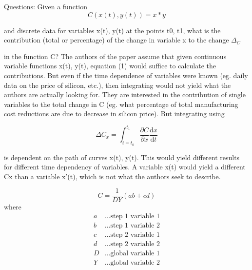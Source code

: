 \documentclass{article}
\begin{document}
Questions:
Given a function
\begin{equation}
    C(x(t), y(t)) = x * y
\end{equation}

and discrete data for variables x(t), y(t) at the points t0, t1, what is the contribution
(total or percentage) of the change in variable x to the change $\Delta_C$

in the function C?
The authors of the paper assume that given continuous variable functions x(t), y(t), equation
(1) would suffice to calculate the contributions. But even if the time dependence
of variables were known (eg. daily data on the price of silicon, etc.), then integrating
would not yield what the authors are actually looking for.
They are interested in the contribution of single variables to the total change in C (eg.
what percentage of total manufacturing cost reductions are due to decrease in silicon
price). But integrating using

\begin{equation}
    \Delta C_x = \int_{t=t_0}^{t_1} \frac{\partial C}{\partial x} \frac{\text{d}x}{\text{d}t}
\end{equation}

is dependent on the path of curves x(t), y(t). This would yield different results for different
time dependency of variables. A variable x(t) would yield a different Cx than a
variable x'(t), which is not what the authors seek to describe.

%
\begin{equation}
    C = \frac{1}{DY}(ab+cd)
\end{equation}
%
where
%
\begin{align*}
    a &\dots \text{step 1 variable 1} \\
    b &\dots \text{step 1 variable 2} \\
    c &\dots \text{step 2 variable 1} \\
    d &\dots \text{step 2 variable 2} \\
    D &\dots \text{global variable 1} \\
    Y &\dots \text{global variable 2}
\end{align*}
%

\clearpage
\printbibliography
\end{document}
